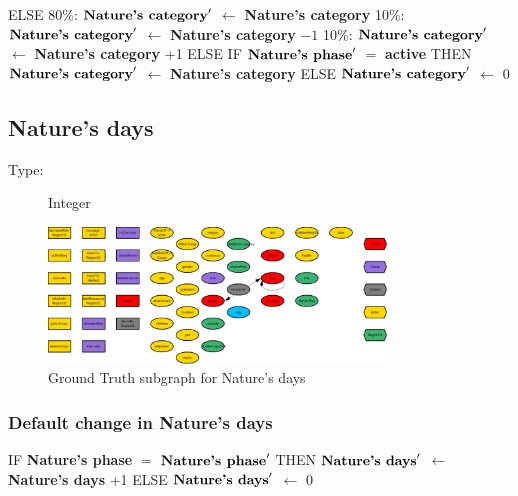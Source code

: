 \documentclass{article}%
\begin{document}
\begin{flushleft}
ELSE %
\linebreak%
\hspace*{10em}%
80\%: %
$\mbox{\textbf{Nature's category}} '$%
$\leftarrow$%
\textbf{Nature's category}%
\linebreak%
\hspace*{10em}%
10\%: %
$\mbox{\textbf{Nature's category}} '$%
$\leftarrow$%
\textbf{Nature's category}%
${-}1$%
\linebreak%
\hspace*{10em}%
10\%: %
$\mbox{\textbf{Nature's category}} '$%
$\leftarrow$%
\textbf{Nature's category}%
+1%
\linebreak%
\hspace*{2em}%
ELSE %
IF %
$\mbox{\textbf{Nature's phase}} '$%
$=$%
\textbf{active}%
\linebreak%
\hspace*{4em}%
THEN %
$\mbox{\textbf{Nature's category}} '$%
$\leftarrow$%
\textbf{Nature's category}%
\linebreak%
\hspace*{4em}%
ELSE %
$\mbox{\textbf{Nature's category}} '$%
$\leftarrow$%
0%
\end{flushleft}

%
\subsection{Nature's days}%
\label{subsec:Nature's days}%
\begin{description}%
\item[Type:]%
Integer%
\end{description}%


\begin{figure}[ht]%
\centering%
\includegraphics[width=0.8\textwidth]{images/daysOfNature.png}%
\caption{Ground Truth subgraph for Nature's days}%
\end{figure}

%
\subsubsection{Default change in Nature's days}%
\label{ssubsec:Default change in Nature's days}%
\begin{flushleft}%
IF %
\textbf{Nature's phase}%
$=$%
$\mbox{\textbf{Nature's phase}} '$%
\linebreak%
\hspace*{2em}%
THEN %
$\mbox{\textbf{Nature's days}} '$%
$\leftarrow$%
\textbf{Nature's days}%
+1%
\linebreak%
\hspace*{2em}%
ELSE %
$\mbox{\textbf{Nature's days}} '$%
$\leftarrow$%
0%
\end{flushleft}
\end{document}
